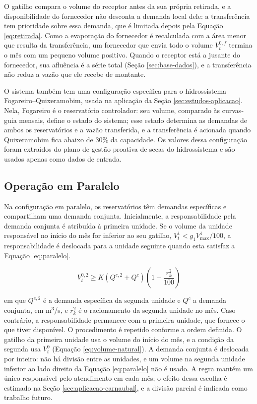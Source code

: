 O gatilho compara o volume do receptor antes da sua própria retirada, e a disponibilidade do fornecedor não desconta a demanda local dele: a transferência tem prioridade sobre essa demanda, que é limitada depois pela Equação \ref{eq:retirada}. Como a evaporação do fornecedor é recalculada com a área menor que resulta da transferência, um fornecedor que envia todo o volume $V^{0,f}_t$ termina o mês com um pequeno volume positivo. Quando o receptor está a jusante do fornecedor, sua afluência é a série total (Seção \ref{sec:base-dados}), e a transferência não reduz a vazão que ele recebe de montante.

O sistema também tem uma configuração específica para o hidrossistema Fogareiro--Quixeramobim, usada na aplicação da Seção \ref{sec:estudos-aplicacao}. Nela, Fogareiro é o reservatório controlador: seu volume, comparado às curvas-guia mensais, define o estado do sistema; esse estado determina as demandas de ambos os reservatórios e a vazão transferida, e a transferência é acionada quando Quixeramobim fica abaixo de 30\% da capacidade. Os valores dessa configuração foram extraídos do plano de gestão proativa de secas do hidrossistema \cite{pgpsFogareiroQuixeramobim2023} e são usados apenas como dados de entrada.

\subsection{Operação em Paralelo}
\label{subsec:operacao-paralelo}

Na configuração em paralelo, os reservatórios têm demandas específicas e compartilham uma demanda conjunta. Inicialmente, a responsabilidade pela demanda conjunta é atribuída à primeira unidade. Se o volume da unidade responsável no início do mês for inferior ao seu gatilho, $V^{1}_t < g_1 V^{1}_{\max}/100$, a responsabilidade é deslocada para a unidade seguinte quando esta satisfaz a Equação \ref{eq:paralelo}.

\begin{equation}
    V^{0,2}_t \geq K \left(Q^{e,2} + Q^{c}\right)\left(1-\frac{r^{2}_k}{100}\right)
    \label{eq:paralelo}
\end{equation}

em que $Q^{e,2}$ é a demanda específica da segunda unidade e $Q^{c}$ a demanda conjunta, em m$^3$/s, e $r^{2}_k$ é o racionamento da segunda unidade no mês. Caso contrário, a responsabilidade permanece com a primeira unidade, que fornece o que tiver disponível. O procedimento é repetido conforme a ordem definida. O gatilho da primeira unidade usa o volume do início do mês, e a condição da segunda usa $V^{0}_t$ (Equação \ref{eq:volume-natural}). A demanda conjunta é deslocada por inteiro: não há divisão entre as unidades, e um volume na segunda unidade inferior ao lado direito da Equação \ref{eq:paralelo} não é usado. A regra mantém um único responsável pelo atendimento em cada mês; o efeito dessa escolha é estimado na Seção \ref{sec:aplicacao-carnaubal}, e a divisão parcial é indicada como trabalho futuro.

